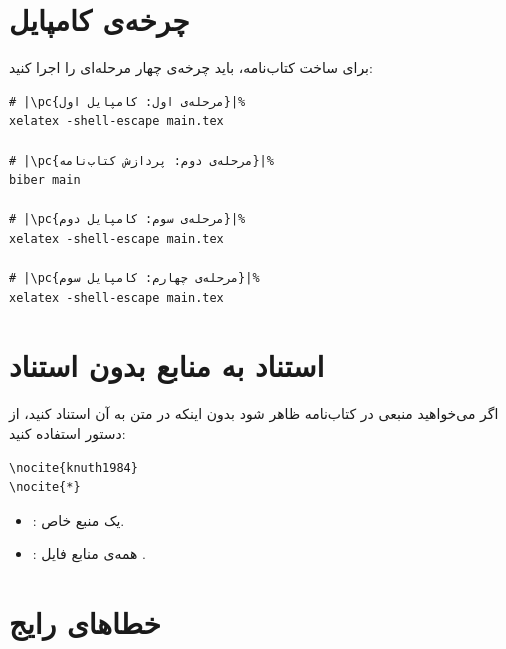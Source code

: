 
\section{چرخه‌ی کامپایل}
\label{sec:bibliography-compile}

برای ساخت کتاب‌نامه، باید چرخه‌ی چهار مرحله‌ای
را اجرا کنید:

\begin{latin}
\begin{verbatim}
# |\pc{مرحله‌ی اول: کامپایل اول}|%
xelatex -shell-escape main.tex

# |\pc{مرحله‌ی دوم: پردازش کتاب‌نامه}|%
biber main

# |\pc{مرحله‌ی سوم: کامپایل دوم}|%
xelatex -shell-escape main.tex

# |\pc{مرحله‌ی چهارم: کامپایل سوم}|%
xelatex -shell-escape main.tex
\end{verbatim}
\end{latin}


\section{استناد به منابع بدون استناد}
\label{sec:bibliography-nocite}

اگر می‌خواهید منبعی در کتاب‌نامه ظاهر شود
بدون اینکه در متن به آن استناد کنید، از دستور
 استفاده کنید:

\begin{latin}
\begin{verbatim}
\nocite{knuth1984}
\nocite{*}
\end{verbatim}
\end{latin}

\begin{itemize}
    \item {}: یک منبع خاص.
    \item {}: همه‌ی منابع فایل
    .
\end{itemize}


\section{خطاهای رایج}
\label{sec:bibliography-mistakes}

